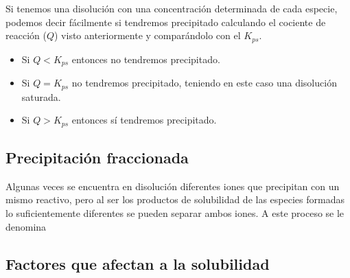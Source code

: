     Si tenemos una disolución con una concentración determinada de cada especie, podemos decir fácilmente si tendremos precipitado calculando el cociente de reacción (\(Q\)) visto anteriormente y comparándolo con el \(K_{ps}\).
    \begin{itemize}
        \item Si \(Q < K_{ps}\) entonces no tendremos precipitado.
        \item Si \(Q = K_{ps}\) no tendremos precipitado, teniendo en este caso una disolución saturada.
        \item Si \(Q > K_{ps}\) entonces sí tendremos precipitado.
    \end{itemize}

    \subsection{Precipitación fraccionada}\label{subsec:precipitacion-fraccionada}

    Algunas veces se encuentra en disolución diferentes iones que precipitan con un mismo reactivo, pero al ser los productos de solubilidad de las especies formadas lo suficientemente diferentes se pueden separar ambos iones.
    A este proceso se le denomina 

    \subsection{Factores que afectan a la solubilidad}\label{subsec:factores-que-afectan-a-la-solubilidad}

